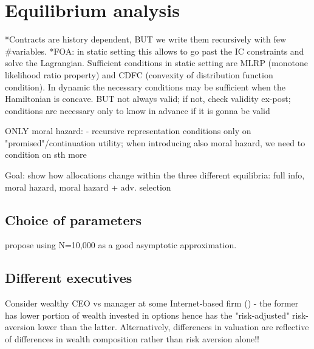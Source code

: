 \section{Equilibrium analysis}

*Contracts are history dependent, BUT we write them recursively with few \#variables.
*FOA: in static setting this allows to go past the IC constraints and solve the Lagrangian. Sufficient conditions in static setting are MLRP (monotone likelihood ratio property) and CDFC (convexity of distribution function condition). In dynamic the necessary conditions may be sufficient when the Hamiltonian is concave.
    BUT not always valid; if not, check validity ex-post; conditions are necessary only to know in advance if it is gonna be valid




ONLY moral hazard:
- recursive representation conditions only on "promised"/continuation utility; when introducing also moral hazard, we need to condition on sth more






Goal: show how allocations change within the three different equilibria: full info, moral hazard, moral hazard + adv. selection 





\subsection*{Choice of parameters}
\cite{dai2005valuing} propose using N=10,000 as a good asymptotic approximation.




\subsection{Different executives}
Consider wealthy CEO vs manager at some Internet-based firm (\cite{carpenter1998exercise}) - the former has lower portion of wealth invested in options hence has the "risk-adjusted" risk-aversion lower than the latter. Alternatively, differences in valuation are reflective of differences in wealth composition rather than risk aversion alone!! \cite{henderson}  